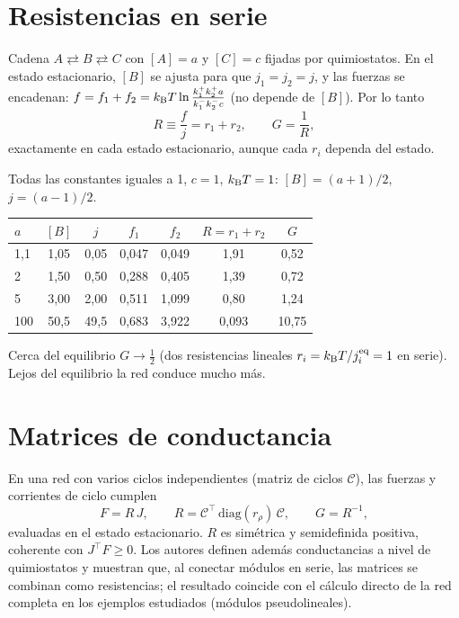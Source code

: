 \documentclass[11pt,a4paper]{article}
\begin{document}
\section{Resistencias en serie}
Cadena $A\rightleftarrows B\rightleftarrows C$ con $[A]=a$ y $[C]=c$ fijadas por quimiostatos. En el estado estacionario, $[B]$ se ajusta para que
$j_1=j_2=j$, y las fuerzas se encadenan: $f=f_1+f_2=k_{\mathrm B} T\ln\frac{k_1^+k_2^+a}{k_1^-k_2^-c}$ (no depende de $[B]$). Por lo tanto
\begin{equation}
R\equiv\frac fj=r_1+r_2,\qquad G=\frac1R,
\end{equation}
exactamente en cada estado estacionario, aunque cada $r_i$ dependa del estado.
\begin{ejemplo}
Todas las constantes iguales a 1, $c=1$, $k_{\mathrm B} T=1$: $[B]=(a+1)/2$, $j=(a-1)/2$.
\begin{center}\begin{tabular}{lcccccc}\toprule
$a$ & $[B]$ & $j$ & $f_1$ & $f_2$ & $R=r_1+r_2$ & $G$\\\midrule
1,1 & 1,05 & 0,05 & 0,047 & 0,049 & 1,91 & 0,52\\
2 & 1,50 & 0,50 & 0,288 & 0,405 & 1,39 & 0,72\\
5 & 3,00 & 2,00 & 0,511 & 1,099 & 0,80 & 1,24\\
100 & 50,5 & 49,5 & 0,683 & 3,922 & 0,093 & 10,75\\\bottomrule\end{tabular}\end{center}
Cerca del equilibrio $G\to\tfrac12$ (dos resistencias lineales $r_i=k_{\mathrm B} T/j^{\text{eq}}_i=1$ en serie). Lejos del equilibrio la red conduce mucho más.
\end{ejemplo}

\section{Matrices de conductancia}
En una red con varios ciclos independientes (matriz de ciclos $\mathcal C$), las fuerzas y corrientes de ciclo cumplen \cite{raux}
\begin{equation}
F=R\,J,\qquad R=\mathcal C^\top\,\mathrm{diag}(r_\rho)\,\mathcal C,\qquad G=R^{-1},
\end{equation}
evaluadas en el estado estacionario. $R$ es simétrica y semidefinida positiva, coherente con $J^\top F\ge0$. Los autores definen además
conductancias a nivel de quimiostatos y muestran que, al conectar módulos en serie, las matrices se combinan como resistencias; el resultado
coincide con el cálculo directo de la red completa en los ejemplos estudiados (módulos pseudolineales).
\end{document}
